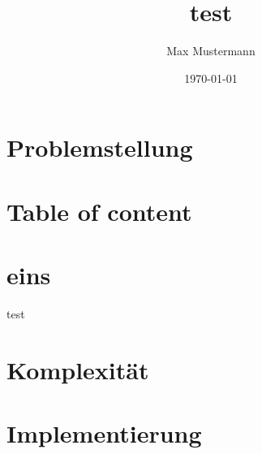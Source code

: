 \documentclass{beamer}
\title{test}
\author{Max Mustermann}
\date{\today}
\institute{Fachhochschule Trier}
\begin{document}
\maketitle

\section{Problemstellung}

\section*{Table of content}
\begin{frame}
	\tableofcontents
\end{frame}

\section{eins}
\begin{frame}
	test
\end{frame}


\section{Komplexität}


\section{Implementierung}

\end{document}
